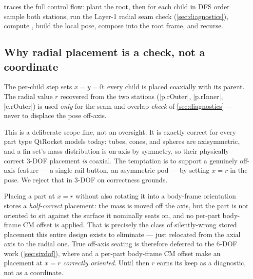  traces the full control flow: plant the root, then for each child in
DFS order sample both stations, run the Layer-1 radial seam check (\cref{sec:diagnostics}), compute
, build the local pose, compose into the root frame, and recurse.


\subsection{Why radial placement is a check, not a coordinate}

The per-child step sets $x = y = 0$: every child is placed coaxially with its parent. The radial
value $r$ recovered from the two stations (\cppinline|p.rOuter|, \cppinline|p.rInner|,
\cppinline|c.rOuter|) is used \emph{only} for the seam and overlap \emph{check} of
\cref{sec:diagnostics} --- never to displace the pose off-axis.

This is a deliberate scope line, not an oversight. It is exactly correct for every part type QtRocket
models today: tubes, cones, and spheres are axisymmetric, and a fin set's mass distribution is
on-axis by symmetry, so their physically correct 3-DOF placement \emph{is} coaxial. The temptation
is to support a genuinely off-axis feature --- a single rail button, an asymmetric pod --- by setting
$x = r$ in the pose. We reject that in 3-DOF on correctness grounds.

\begin{rejected}
Placing a part at $x = r$ without also rotating it into a body-frame orientation stores a
\emph{half-correct} placement: the mass is moved off the axis, but the part is not oriented to sit
against the surface it nominally seats on, and no per-part body-frame CM offset is applied. That is
precisely the class of silently-wrong stored placement this entire design exists to eliminate ---
just relocated from the axial axis to the radial one. True off-axis seating is therefore deferred to
the 6-DOF work (\cref{sec:sixdof}), where  and a per-part body-frame CM
offset make an  placement at $x = r$ \emph{correctly oriented}. Until then $r$ earns
its keep as a diagnostic, not as a coordinate.
\end{rejected}

